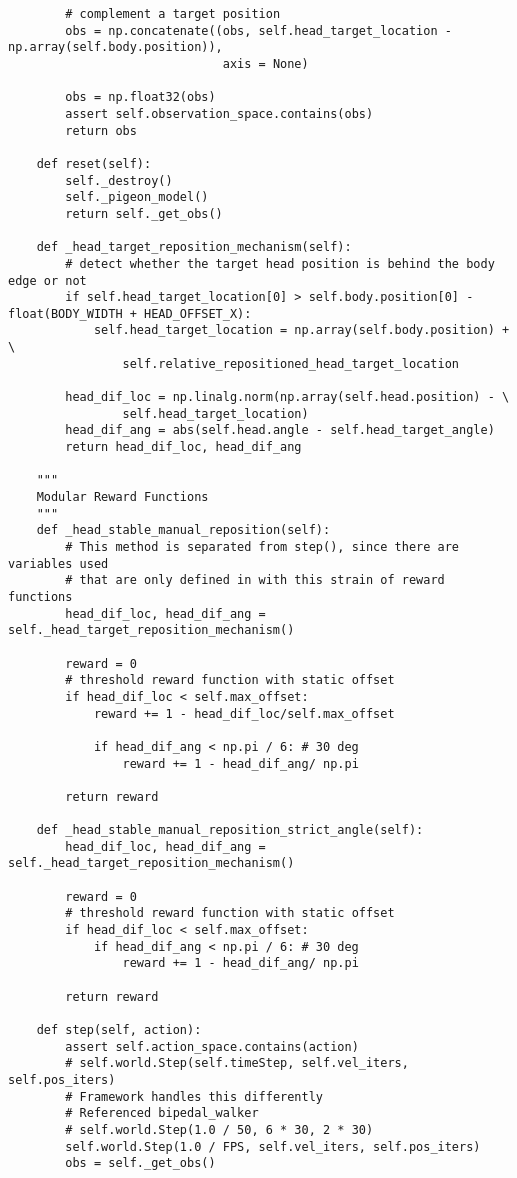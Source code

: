 \begin{itemize}
\begin{lstlisting}
        # complement a target position
        obs = np.concatenate((obs, self.head_target_location - np.array(self.body.position)),
                              axis = None)

        obs = np.float32(obs)
        assert self.observation_space.contains(obs)
        return obs

    def reset(self):
        self._destroy()
        self._pigeon_model()
        return self._get_obs()

    def _head_target_reposition_mechanism(self):
        # detect whether the target head position is behind the body edge or not
        if self.head_target_location[0] > self.body.position[0] - float(BODY_WIDTH + HEAD_OFFSET_X):
            self.head_target_location = np.array(self.body.position) + \
                self.relative_repositioned_head_target_location

        head_dif_loc = np.linalg.norm(np.array(self.head.position) - \
                self.head_target_location)
        head_dif_ang = abs(self.head.angle - self.head_target_angle)
        return head_dif_loc, head_dif_ang

    """
    Modular Reward Functions
    """
    def _head_stable_manual_reposition(self):
        # This method is separated from step(), since there are variables used
        # that are only defined in with this strain of reward functions
        head_dif_loc, head_dif_ang = self._head_target_reposition_mechanism()

        reward = 0
        # threshold reward function with static offset
        if head_dif_loc < self.max_offset:
            reward += 1 - head_dif_loc/self.max_offset

            if head_dif_ang < np.pi / 6: # 30 deg
                reward += 1 - head_dif_ang/ np.pi

        return reward

    def _head_stable_manual_reposition_strict_angle(self):
        head_dif_loc, head_dif_ang = self._head_target_reposition_mechanism()

        reward = 0
        # threshold reward function with static offset
        if head_dif_loc < self.max_offset:
            if head_dif_ang < np.pi / 6: # 30 deg
                reward += 1 - head_dif_ang/ np.pi

        return reward

    def step(self, action):
        assert self.action_space.contains(action)
        # self.world.Step(self.timeStep, self.vel_iters, self.pos_iters)
        # Framework handles this differently
        # Referenced bipedal_walker
        # self.world.Step(1.0 / 50, 6 * 30, 2 * 30)
        self.world.Step(1.0 / FPS, self.vel_iters, self.pos_iters)
        obs = self._get_obs()


\end{lstlisting}
\end{itemize}

